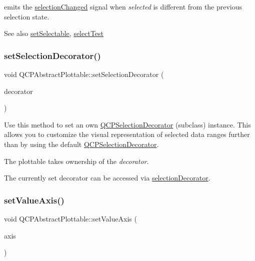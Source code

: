 emits the \hyperlink{class_q_c_p_abstract_plottable_a3af66432b1dca93b28e00e78a8c7c1d9}{selection\+Changed} signal when {\itshape selected} is different from the previous selection state.

\begin{DoxySeeAlso}{See also}
\hyperlink{class_q_c_p_abstract_plottable_ac238d6e910f976f1f30d41c2bca44ac3}{set\+Selectable}, \hyperlink{class_q_c_p_abstract_plottable_a38efe9641d972992a3d44204bc80ec1d}{select\+Test} 
\end{DoxySeeAlso}
\mbox{\label{class_q_c_p_abstract_plottable_a20e266ad646f8c4a7e4631040510e5d9}} 
\subsubsection{\texorpdfstring{set\+Selection\+Decorator()}{setSelectionDecorator()}}
{\footnotesize\ttfamily void Q\+C\+P\+Abstract\+Plottable\+::set\+Selection\+Decorator (\begin{DoxyParamCaption}\item[{\hyperlink{class_q_c_p_selection_decorator}{Q\+C\+P\+Selection\+Decorator} $\ast$}]{decorator }\end{DoxyParamCaption})}

Use this method to set an own \hyperlink{class_q_c_p_selection_decorator}{Q\+C\+P\+Selection\+Decorator} (subclass) instance. This allows you to customize the visual representation of selected data ranges further than by using the default \hyperlink{class_q_c_p_selection_decorator}{Q\+C\+P\+Selection\+Decorator}.

The plottable takes ownership of the {\itshape decorator}.

The currently set decorator can be accessed via \hyperlink{class_q_c_p_abstract_plottable_a7861518e47ca0c6a0c386032c2db075e}{selection\+Decorator}. \mbox{\label{class_q_c_p_abstract_plottable_a71626a07367e241ec62ad2c34baf21cb}} 
\subsubsection{\texorpdfstring{set\+Value\+Axis()}{setValueAxis()}}
{\footnotesize\ttfamily void Q\+C\+P\+Abstract\+Plottable\+::set\+Value\+Axis (\begin{DoxyParamCaption}\item[{\hyperlink{class_q_c_p_axis}{Q\+C\+P\+Axis} $\ast$}]{axis }\end{DoxyParamCaption})}

